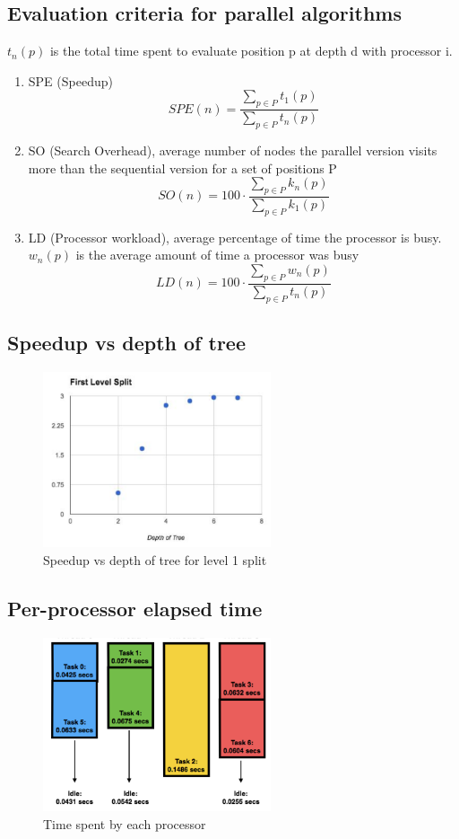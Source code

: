 \documentclass[12pt]{article}
\begin{document}
\subsection{Evaluation criteria for parallel algorithms}

$t_n(p)$ is the total time spent to evaluate position p at depth d with
processor i.

\begin{enumerate}
  \item SPE (Speedup)
    \[
      SPE(n) = \frac{\sum_{p \in P} t_1(p)}{\sum_{p \in P} t_n(p)}
    \]
  \item SO (Search Overhead), average number of nodes the parallel version
    visits more than the sequential version for a set of positions P
    \[
      SO(n) = 100 \cdot \frac{\sum_{p \in P} k_n(p)}{\sum_{p \in P} k_1(p)}
    \]
  \item LD (Processor workload), average percentage of time the processor is
    busy. $w_n(p)$ is the average amount of time a processor was busy
    \[
      LD(n) = 100 \cdot \frac{\sum_{p \in P} w_n(p)}{\sum_{p \in P} t_n(p)}
    \]
\end{enumerate}

\subsection{Speedup vs depth of tree}

\begin{figure}[H]
  \centering
  \includegraphics[width=0.6\textwidth, height=0.4\textwidth]{speedup_depthtree.png}
  \caption{Speedup vs depth of tree for level 1 split}
\end{figure}

\subsection{Per-processor elapsed time}

\begin{figure}[H]
  \centering
  \includegraphics[width=0.6\textwidth, height=0.4\textwidth]{processor_time.png}
  \caption{Time spent by each processor}
\end{figure}
\end{document}
